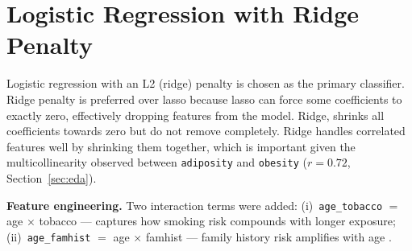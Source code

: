\documentclass[12pt,a4paper]{article}
\begin{document}
\section{Logistic Regression with Ridge Penalty}
\label{sec:lrrp}

Logistic regression with an L2 (ridge) penalty
is chosen as the primary classifier. 
Ridge penalty is preferred over lasso \cite{hassan2022effectively}
because lasso can force some coefficients to exactly zero, effectively
dropping features from the model. Ridge, shrinks all
coefficients towards zero but do not remove completely. Ridge handles correlated features well by shrinking
them together, which is important given the multicollinearity observed between
\texttt{adiposity} and \texttt{obesity} ($r=0.72$, Section~\ref{sec:eda}).

\textbf{Feature engineering.}
Two interaction terms were added:
(i)~\texttt{age\_tobacco} $=$ age $\times$ tobacco --- captures how
smoking risk compounds with longer exposure;
(ii)~\texttt{age\_famhist} $=$ age $\times$ famhist --- family history
risk amplifies with age \cite{patel2023famhist}.
\end{document}
